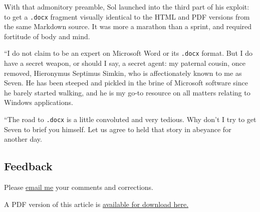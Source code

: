 \documentclass[
  british,
  a4paper,
  rgb,
  dvipsnames,
  svgnames,
  hyphens]{article}
\begin{document}
With that admonitory preamble, Sol launched into the third part of his
exploit: to get a \texttt{.docx} fragment visually identical to the HTML
and PDF versions from the same Markdown source. It was more a marathon
than a sprint, and required fortitude of body and mind.

``I do not claim to be an expert on Microsoft Word or its \texttt{.docx}
format. But I do have a secret weapon, or should I say, a secret agent:
my paternal cousin, once removed, Hieronymus Septimus Simkin, who is
affectionately known to me as Seven. He has been steeped and pickled in
the brine of Microsoft software since he barely started walking, and he
is my go-to resource on all matters relating to Windows applications.

``The road to \texttt{.docx} is a little convoluted and very tedious.
Why don't I try to get Seven to brief you himself. Let us agree to held
that story in abeyance for another day.

\hypertarget{feedback}{%
\subsection{Feedback}\label{feedback}}

Please \href{mailto:feedback.swanlotus@gmail.com}{email me} your
comments and corrections.

\noindent A PDF version of this article is
\href{./using-font-awesome.pdf}{available for download here.}
\end{document}
